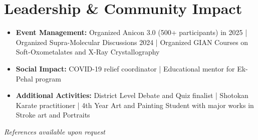 \documentclass[a4paper,9pt]{article}
\newcommand{\compactSection}[2]{
    \section{#1}
    \vspace{-0.1cm}
    #2
    \vspace{-0.2cm}
}
\begin{document}
\compactSection{Leadership \& Community Impact}{
\begin{itemize}[leftmargin=*,label={},itemsep=2pt]
    \item \textbf{Event Management:} \small {Organized Anicon 3.0 (500+ participants) in 2025 | Organized Supra-Molecular Discussions 2024 | Organized GIAN Courses on Soft-Oxometalates and X-Ray Crystallography}
    \item \textbf{Social Impact:} \small{ COVID-19 relief coordinator | Educational mentor for Ek-Pehal program}
    \item \textbf{Additional Activities:} \small {District Level Debate and Quiz finalist | Shotokan Karate practitioner | 4th Year Art and Painting Student with major works in Stroke art and Portraits}
\end{itemize}
}
\vspace{-0.4cm}
\vspace*{\fill}
\begin{flushright}
\textit{References available upon request}
\end{flushright}
\end{document}
